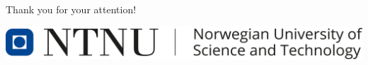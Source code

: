 \documentclass[12pt]{beamer}
\begin{document}
\begin{frame}
\centering
Thank you for your attention!\\
		\vskip 0.8cm

\centering
\includegraphics[scale=0.2]{ntnulogo_eng.png}
\end{frame} 
\end{document}
